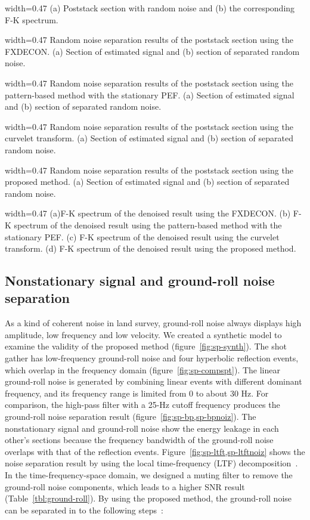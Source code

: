 {width=0.47\columnwidth}
{(a) Poststack section with random noise and (b) the corresponding F-K spectrum.}

{width=0.47\columnwidth}
{Random noise separation results of the poststack section using the FXDECON.
    (a) Section of estimated signal and (b) section of separated random noise.}

{width=0.47\columnwidth}
{Random noise separation results of the poststack section using the
    pattern-based method with the stationary PEF.
    (a) Section of estimated signal and (b) section of separated random noise.}

{width=0.47\columnwidth}
{Random noise separation results of the poststack section using the curvelet transform.
    (a) Section of estimated signal and (b) section of separated random noise.}

{width=0.47\columnwidth}
{Random noise separation results of the poststack section using the proposed method.
    (a) Section of estimated signal and (b) section of separated random noise.}

{width=0.47\columnwidth}
{   (a)F-K spectrum of the denoised result using the FXDECON.
    (b) F-K spectrum of the denoised result using the pattern-based method with the stationary PEF.
    (c) F-K spectrum of the denoised result using the curvelet transform.
    (d) F-K spectrum of the denoised result using the proposed method.}


\subsection{Nonstationary signal and ground-roll noise separation}

As a kind of coherent noise in land survey, ground-roll noise always
displays high amplitude, low frequency and low velocity. We created a
synthetic model to examine the validity of the proposed method
(figure~\ref{fig:sp-synth}). The shot gather has low-frequency ground-roll
noise and four hyperbolic reflection events, which overlap in the
frequency domain (figure~\ref{fig:sp-compspt}). The linear ground-roll
noise is generated by combining linear events with different dominant
frequency, and its frequency range is limited from 0 to about 30 Hz.
For comparison, the high-pass filter with a 25-Hz cutoff frequency
produces the ground-roll noise separation result
(figure~\ref{fig:sp-bp,sp-bpnoiz}).
The nonstationary signal and ground-roll noise show the energy leakage
in each other's sections because the frequency bandwidth of the
ground-roll noise overlaps with that of the reflection events.
Figure~\ref{fig:sp-ltft,sp-ltftnoiz} shows the noise separation result
by using the local time-frequency (LTF) decomposition~\cite[]{Liu13}.
In the time-frequency-space domain, we designed a muting filter to remove
the ground-roll noise components, which leads to a higher SNR result
(Table~\ref{tbl:ground-roll}). By using the proposed method, the ground-roll
noise can be separated in to the following steps~\cite[]{Fomel02}:

